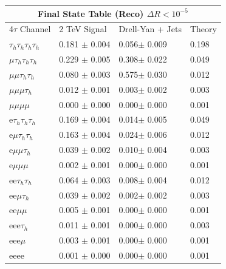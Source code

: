 \documentclass{article}
\begin{document}
 
\begin{landscape} 
\centering 
\begin{tabular}{|p{4.5cm}|p{3cm}|p{3cm}|p{3cm}|}\hline 
\multicolumn{4}{|c|}{Final State Table (Reco) \(\Delta R < 10^{-5}\)} \\ 
\hline 
4$\tau$ Channel & 2 TeV Signal & Drell-Yan + Jets & Theory \\ 
\hline 
$\tau_h$$\tau_h$$\tau_h$$\tau_h$ & 0.181 $\pm$ 0.004 & 0.056$\pm$ 0.009 & 0.198\\
\hline 
$\mu$$\tau_h$$\tau_h$$\tau_h$ & 0.229 $\pm$ 0.005 & 0.308$\pm$ 0.022 & 0.049\\
\hline 
$\mu$$\mu$$\tau_h$$\tau_h$ & 0.080 $\pm$ 0.003 & 0.575$\pm$ 0.030 & 0.012\\
\hline 
$\mu$$\mu$$\mu$$\tau_h$ & 0.012 $\pm$ 0.001 & 0.003$\pm$ 0.002 & 0.003\\
\hline 
$\mu$$\mu$$\mu$$\mu$ & 0.000 $\pm$ 0.000 & 0.000$\pm$ 0.000 & 0.001\\
\hline 
e$\tau_h$$\tau_h$$\tau_h$ & 0.169 $\pm$ 0.004 & 0.014$\pm$ 0.005 & 0.049\\
\hline 
e$\mu$$\tau_h$$\tau_h$ & 0.163 $\pm$ 0.004 & 0.024$\pm$ 0.006 & 0.012\\
\hline 
e$\mu$$\mu$$\tau_h$ & 0.039 $\pm$ 0.002 & 0.010$\pm$ 0.004 & 0.003\\
\hline 
e$\mu$$\mu$$\mu$ & 0.002 $\pm$ 0.001 & 0.000$\pm$ 0.000 & 0.001\\
\hline 
ee$\tau_h$$\tau_h$ & 0.064 $\pm$ 0.003 & 0.008$\pm$ 0.004 & 0.012\\
\hline 
ee$\mu$$\tau_h$ & 0.039 $\pm$ 0.002 & 0.002$\pm$ 0.002 & 0.003\\
\hline 
ee$\mu$$\mu$ & 0.005 $\pm$ 0.001 & 0.000$\pm$ 0.000 & 0.001\\
\hline 
eee$\tau_h$ & 0.011 $\pm$ 0.001 & 0.000$\pm$ 0.000 & 0.003\\
\hline 
eee$\mu$ & 0.003 $\pm$ 0.001 & 0.000$\pm$ 0.000 & 0.001\\
\hline 
eeee & 0.001 $\pm$ 0.000 & 0.000$\pm$ 0.000 & 0.001\\
\hline 
\end{tabular} 
\end{landscape} 
\end{document}
